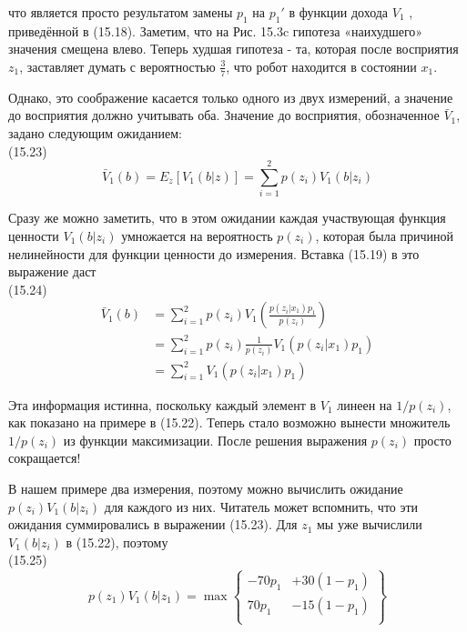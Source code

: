 \documentclass[10pt,a4paper]{article}
\begin{document}
что является просто результатом замены $p_1$ на $p_1'$ в функции дохода $V_1$ , приведённой в (15.18). Заметим, что на Рис. 15.3c гипотеза «наихудшего» значения смещена влево. Теперь худшая гипотеза - та, которая после восприятия $z_1$, заставляет думать с  вероятностью $\frac{3}{7}$, что робот находится в состоянии $x_1$.

Однако, это соображение касается только одного из двух измерений, а значение до восприятия должно учитывать оба. Значение до восприятия, обозначенное $\bar{V}_1$, задано следующим ожиданием:\\

(15.23)
$$\bar{V}_1(b)=E_z[V_1(b|z)]=\sum_{i=1}^2p(z_i)V_1(b|z_i)$$

Сразу же можно заметить, что в этом ожидании каждая участвующая функция ценности $V_1(b|z_i)$ умножается на вероятность $p(z_i)$, которая была причиной нелинейности для функции ценности до измерения. Вставка (15.19) в это выражение даст\\

(15.24)
\begin{equation*}
\begin{split}
\bar{V}_1(b)&=\sum_{i=1}^2p(z_i)V_1(\frac{p(z_i|x_1)p_1}{p(z_i)})\\
&=\sum_{i=1}^2p(z_i)\frac{1}{p(z_i)}V_1(p(z_i|x_1)p_1)\\
&=\sum_{i=1}^2V_1(p(z_i|x_1)p_1)
\end{split}
\end{equation*}

Эта информация истинна, поскольку каждый элемент в $V_1$ линеен на $1/p(z_i)$, как показано на примере в (15.22). Теперь стало возможно вынести множитель $1/p(z_i)$ из функции максимизации. После решения выражения $p(z_i)$ просто сокращается!

В нашем примере два измерения, поэтому можно вычислить ожидание $p(z_i) V_1(b|z_i)$ для каждого из них. Читатель может вспомнить, что эти ожидания суммировались в выражении (15.23). Для $z_1$ мы уже вычислили $V_1(b|z_i)$ в (15.22), поэтому\\

(15.25)
\begin{equation*}
p(z_1)V_1(b|z_1)=\max\left\{
\begin{array}{rr}
-70p_1&+30(1-p_1)\\
70p_1&-15(1-p_1)\\
\end{array}
\right\}
\end{equation*}
\end{document}
